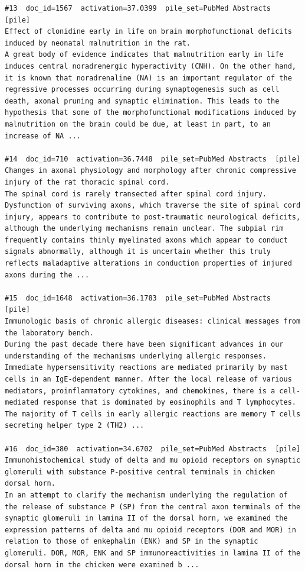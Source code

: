 \begin{verbatim}
#13  doc_id=1567  activation=37.0399  pile_set=PubMed Abstracts  [pile]
Effect of clonidine early in life on brain morphofunctional deficits induced by neonatal malnutrition in the rat.
A great body of evidence indicates that malnutrition early in life induces central noradrenergic hyperactivity (CNH). On the other hand, it is known that noradrenaline (NA) is an important regulator of the regressive processes occurring during synaptogenesis such as cell death, axonal pruning and synaptic elimination. This leads to the hypothesis that some of the morphofunctional modifications induced by malnutrition on the brain could be due, at least in part, to an increase of NA ...

#14  doc_id=710  activation=36.7448  pile_set=PubMed Abstracts  [pile]
Changes in axonal physiology and morphology after chronic compressive injury of the rat thoracic spinal cord.
The spinal cord is rarely transected after spinal cord injury. Dysfunction of surviving axons, which traverse the site of spinal cord injury, appears to contribute to post-traumatic neurological deficits, although the underlying mechanisms remain unclear. The subpial rim frequently contains thinly myelinated axons which appear to conduct signals abnormally, although it is uncertain whether this truly reflects maladaptive alterations in conduction properties of injured axons during the ...

#15  doc_id=1648  activation=36.1783  pile_set=PubMed Abstracts  [pile]
Immunologic basis of chronic allergic diseases: clinical messages from the laboratory bench.
During the past decade there have been significant advances in our understanding of the mechanisms underlying allergic responses. Immediate hypersensitivity reactions are mediated primarily by mast cells in an IgE-dependent manner. After the local release of various mediators, proinflammatory cytokines, and chemokines, there is a cell-mediated response that is dominated by eosinophils and T lymphocytes. The majority of T cells in early allergic reactions are memory T cells secreting helper type 2 (TH2) ...

#16  doc_id=380  activation=34.6702  pile_set=PubMed Abstracts  [pile]
Immunohistochemical study of delta and mu opioid receptors on synaptic glomeruli with substance P-positive central terminals in chicken dorsal horn.
In an attempt to clarify the mechanism underlying the regulation of the release of substance P (SP) from the central axon terminals of the synaptic glomeruli in lamina II of the dorsal horn, we examined the expression patterns of delta and mu opioid receptors (DOR and MOR) in relation to those of enkephalin (ENK) and SP in the synaptic glomeruli. DOR, MOR, ENK and SP immunoreactivities in lamina II of the dorsal horn in the chicken were examined b ...


\end{verbatim}
